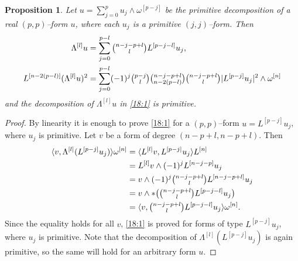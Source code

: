 \documentclass[11pt,a4paper]{amsart}
\def\^#1{^{[#1]}}
\def\la{\langle}
\def\ra{\rangle}
\newtheorem{prop}[theo]{Proposition}
\theoremstyle{definition}
\numberwithin{equation}{section}
\begin{document}
\begin{prop}
    \label{prop:morphism}
Let $u = \sum_{j=0}^p u_j \wedge \omega\^{p-j}$ be the primitive
decomposition of a real $(p,p)$--form $u$, where each $u_j$ is a
primitive $(j,j)$--form. Then
\begin{align}
  \label{18:1}
  \Lambda\^ l u 
  &= \sum_{j=0}^{p-l} \tbinom{n-j-p+l}{l} L\^{p-j-l} u_j , \\
  \label{18:2}
  L\^{n-2(p-l)} (\Lambda\^ l u)^2   
  &= \sum_{j=0}^{p-l} 
  (-1)^j
  \tbinom{p-j}{l}
  \tbinom{n-j-p+l}{n-2(p-l)}
  \tbinom{n-j-p+l}{l}
  \lvert L\^{p-j} u_j \rvert^2
  \wedge \omega\^ n
\end{align}
and the decomposition of $\Lambda\^ l u$ in \eqref{18:1} is primitive.
\end{prop}

\begin{proof}
  By linearity it is enough to prove \eqref{18:1} for a $(p,p)$--form
$u = L\^{p-j} u_j$, where $u_j$ is primitive. Let $v$ be a form
of degree $(n-p+l,n-p+l)$. Then
  \begin{align*}
    \la v, \Lambda\^ l (L\^{p-j} u_j ) \ra \omega\^ n
    &= \la L\^ l v, L\^{p-j} u_j \ra L\^ n \\
    &= L\^ l v \wedge (-1)^j L\^{n-j-p} u_j  \\
    &= v \wedge (-1)^j \tbinom{n-j-p+l}{l} L\^{n-j-p+l} u_j  \\
    &= v \wedge * \bigl( \tbinom{n-j-p+l}{l} L\^{p-j-l} u_j \bigr) \\
    &= \la v, \tbinom{n-j-p+l}{l} L\^{p-j-l} u_j \ra \omega\^ n.
  \end{align*}
Since the equality holds for all $v$, \eqref{18:1} is proved for forms
of type $L\^{p-j} u_j$, where $u_j$ is primitive. Note that the
decomposition of $\Lambda\^ l (L\^{p-j} u_j)$ is again primitive, so
the same will hold for an arbitrary form $u$.


\end{proof}
\end{document}
